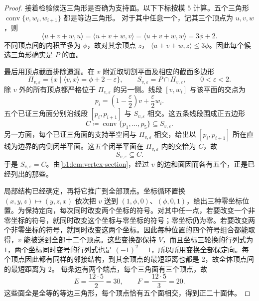 \begin{proof}
	接着检验候选三角形是否确为支持面。以下下标按模 \(5\) 计算。五个三角形 \(\operatorname{conv}\{v,w_i,w_{i+1}\}\) 都是等边三角形。 对于其中任意一个，记其三个顶点为 \(u,v,w\)，则
	\[
		\langle u+v+w,u\rangle =\langle u+v+w,v\rangle =\langle u+v+w,w\rangle=3\phi+2.
	\]
	不同顶点间的内积至多为 \(\phi\)，故对其余顶点 \(z\)， \(\langle u+v+w,z\rangle\leq3\phi\)。因此每个候选三角形确实是 \(P\) 的面。

	最后用顶点截面排除遗漏。在 \(v\) 附近取切割平面及相应的截面多边形
	\[
		\Pi_{v,\varepsilon} =\{x\mid\langle v,x\rangle=\phi+2-\varepsilon\}, \qquad S_{v,\varepsilon}=P\cap\Pi_{v,\varepsilon}, \qquad 0<\varepsilon<2.
	\]
	除 \(v\) 外的所有顶点都严格位于 \(\Pi_{v,\varepsilon}\) 的另一侧。线段 \([v,w_i]\) 与该平面的交点为
	\[
		p_i=\left(1-\frac{\varepsilon}{2}\right)v +\frac{\varepsilon}{2}w_i.
	\]
	五个已证三角面分别沿线段 \([p_i,p_{i+1}]\) 与 \(S_{v,\varepsilon}\) 相交。这五条线段围成正五边形
	\[
		C\coloneqq\operatorname{conv}\{p_1,\ldots,p_5\} \subseteq S_{v,\varepsilon}.
	\]
	另一方面，每个已证三角面的支持半空间与 \(\Pi_{v,\varepsilon}\) 相交，给出以 \([p_i,p_{i+1}]\) 所在直线为边界的内侧闭半平面。这五个闭半平面在 \(\Pi_{v,\varepsilon}\) 内的交恰为 \(C\)，故
	\[
		S_{v,\varepsilon}\subseteq C.
	\]
	于是 \(S_{v,\varepsilon}=C\)。由\cref{b1:lem:vertex-section}，经过 \(v\) 的边和面因而各有五个，正是已经列出的那些。

	局部结构已经确定，再将它推广到全部顶点。坐标循环置换 \((x,y,z)\mapsto(y,z,x)\) 依次把 \(v\) 送到 \((1,\phi,0)\)、\((\phi,0,1)\)，给出三种零坐标位置。为保持定向，每次同时改变两个坐标的符号。对其中任一点，若要改变一个非零坐标的符号，就同时改变这个坐标与零坐标的符号；零坐标仍为零。若要改变两个非零坐标的符号，就同时改变这两个坐标。因此每种位置的四个符号组合都能取得，\(v\) 能被送到全部十二个顶点。这些变换都保持 \(V\)，而且坐标三轮换的行列式为 \(1\)，两个坐标同时变号的行列式也是 \((-1)^2=1\)，所以所用变换全部保定向。每个顶点因此都有同样的邻接结构，到其余顶点的最短距离也都是 \(2\)，故全体顶点间的最短距离为 \(2\)。 每条边有两个端点，每个三角面有三个顶点，故
	\[
		E=\frac{12\cdot5}{2}=30, \qquad F=\frac{12\cdot5}{3}=20.
	\]
	这些面全是全等的等边三角形，每个顶点恰有五个面相交，得到正二十面体。
\end{proof}

